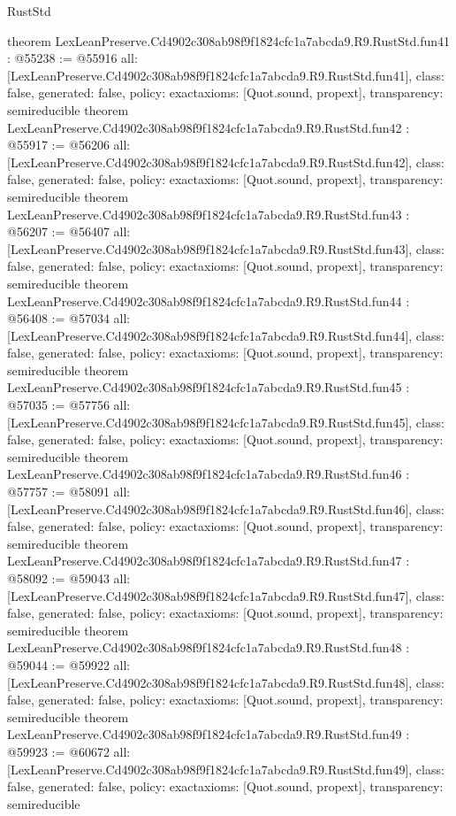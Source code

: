 \begin{lexlean}{RustStd}
\begin{coremodule}
{}
theorem LexLeanPreserve.Cd4902c308ab98f9f1824cfc1a7abcda9.R9.RustStd.fun41 : @55238 := @55916 {
  all: [LexLeanPreserve.Cd4902c308ab98f9f1824cfc1a7abcda9.R9.RustStd.fun41],
  class: false,
  generated: false,
  policy: exact{axioms: [Quot.sound, propext]},
  transparency: semireducible
}
theorem LexLeanPreserve.Cd4902c308ab98f9f1824cfc1a7abcda9.R9.RustStd.fun42 : @55917 := @56206 {
  all: [LexLeanPreserve.Cd4902c308ab98f9f1824cfc1a7abcda9.R9.RustStd.fun42],
  class: false,
  generated: false,
  policy: exact{axioms: [Quot.sound, propext]},
  transparency: semireducible
}
theorem LexLeanPreserve.Cd4902c308ab98f9f1824cfc1a7abcda9.R9.RustStd.fun43 : @56207 := @56407 {
  all: [LexLeanPreserve.Cd4902c308ab98f9f1824cfc1a7abcda9.R9.RustStd.fun43],
  class: false,
  generated: false,
  policy: exact{axioms: [Quot.sound, propext]},
  transparency: semireducible
}
theorem LexLeanPreserve.Cd4902c308ab98f9f1824cfc1a7abcda9.R9.RustStd.fun44 : @56408 := @57034 {
  all: [LexLeanPreserve.Cd4902c308ab98f9f1824cfc1a7abcda9.R9.RustStd.fun44],
  class: false,
  generated: false,
  policy: exact{axioms: [Quot.sound, propext]},
  transparency: semireducible
}
theorem LexLeanPreserve.Cd4902c308ab98f9f1824cfc1a7abcda9.R9.RustStd.fun45 : @57035 := @57756 {
  all: [LexLeanPreserve.Cd4902c308ab98f9f1824cfc1a7abcda9.R9.RustStd.fun45],
  class: false,
  generated: false,
  policy: exact{axioms: [Quot.sound, propext]},
  transparency: semireducible
}
theorem LexLeanPreserve.Cd4902c308ab98f9f1824cfc1a7abcda9.R9.RustStd.fun46 : @57757 := @58091 {
  all: [LexLeanPreserve.Cd4902c308ab98f9f1824cfc1a7abcda9.R9.RustStd.fun46],
  class: false,
  generated: false,
  policy: exact{axioms: [Quot.sound, propext]},
  transparency: semireducible
}
theorem LexLeanPreserve.Cd4902c308ab98f9f1824cfc1a7abcda9.R9.RustStd.fun47 : @58092 := @59043 {
  all: [LexLeanPreserve.Cd4902c308ab98f9f1824cfc1a7abcda9.R9.RustStd.fun47],
  class: false,
  generated: false,
  policy: exact{axioms: [Quot.sound, propext]},
  transparency: semireducible
}
theorem LexLeanPreserve.Cd4902c308ab98f9f1824cfc1a7abcda9.R9.RustStd.fun48 : @59044 := @59922 {
  all: [LexLeanPreserve.Cd4902c308ab98f9f1824cfc1a7abcda9.R9.RustStd.fun48],
  class: false,
  generated: false,
  policy: exact{axioms: [Quot.sound, propext]},
  transparency: semireducible
}
theorem LexLeanPreserve.Cd4902c308ab98f9f1824cfc1a7abcda9.R9.RustStd.fun49 : @59923 := @60672 {
  all: [LexLeanPreserve.Cd4902c308ab98f9f1824cfc1a7abcda9.R9.RustStd.fun49],
  class: false,
  generated: false,
  policy: exact{axioms: [Quot.sound, propext]},
  transparency: semireducible
}
\end{coremodule}
\end{lexlean}
